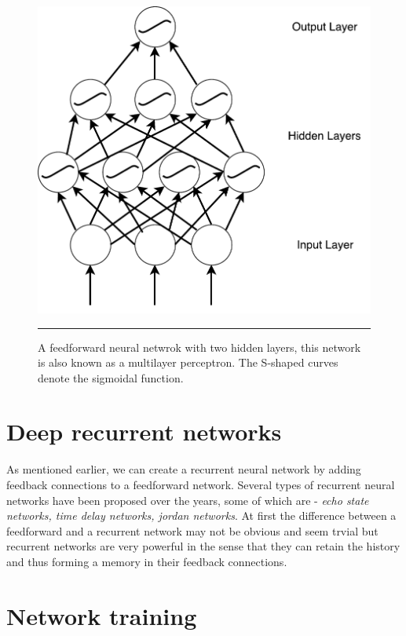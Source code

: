 \def\layersep{2.5cm}
\begin{figure}
\centering
\includegraphics[width=\textwidth,height=\textheight,keepaspectratio]
    {Figures/mlp.pdf}
    \rule{35em}{0.5pt}
\caption{A feedforward neural netwrok with two hidden layers, this network is also known as a
multilayer perceptron. The S-shaped curves denote the sigmoidal function.}
\label{fig:ffnnetwork}
\end{figure}

\section{Deep recurrent networks}
As mentioned earlier, we can create a recurrent neural network by adding feedback connections to
a feedforward network. Several types of recurrent neural networks have been proposed over the
years, some of which are - \emph{echo state networks, time delay networks, jordan networks}. At
first the difference between a feedforward and a recurrent network may not be obvious and seem
trvial but recurrent networks are very powerful in the sense that they can retain the history and
thus forming a memory in their feedback connections.



\section{Network training}

